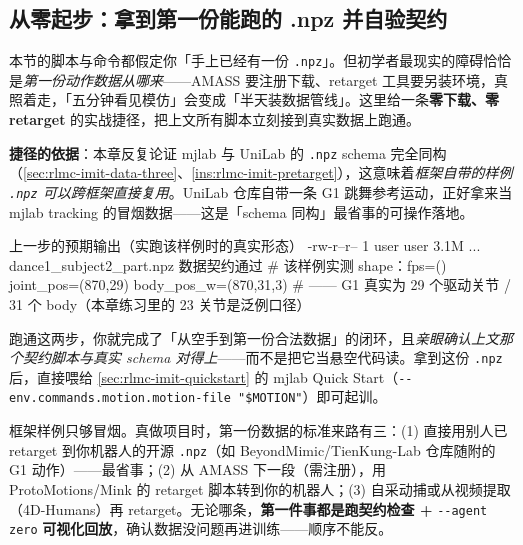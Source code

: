 \subsection{从零起步：拿到第一份能跑的 .npz 并自验契约}
\label{sec:rlmc-imit-data-bootstrap}

本节的脚本与命令都假定你「手上已经有一份 \texttt{.npz}」。但初学者最现实的障碍恰恰是\emph{第一份动作数据从哪来}——AMASS 要注册下载、retarget 工具要另装环境，真照着走，「五分钟看见模仿」会变成「半天装数据管线」。这里给一条\textbf{零下载、零 retarget} 的实战捷径，把上文所有脚本立刻接到真实数据上跑通。

\textbf{捷径的依据}：本章反复论证 mjlab 与 UniLab 的 \texttt{.npz} schema 完全同构（\cref{sec:rlmc-imit-data-three}、\cref{ins:rlmc-imit-pretarget}），这意味着\emph{框架自带的样例 \texttt{.npz} 可以跨框架直接复用}。UniLab 仓库自带一条 G1 跳舞参考运动，正好拿来当 mjlab tracking 的冒烟数据——这是「schema 同构」最省事的可操作落地。


\begin{codebox}[text]{上一步的预期输出（实跑该样例时的真实形态）}
-rw-r--r-- 1 user user 3.1M ... dance1_subject2_part.npz
数据契约通过
# 该样例实测 shape：fps=()  joint_pos=(870,29)  body_pos_w=(870,31,3)
#   —— G1 真实为 29 个驱动关节 / 31 个 body（本章练习里的 23 关节是泛例口径）
\end{codebox}

跑通这两步，你就完成了「从空手到第一份合法数据」的闭环，且\emph{亲眼确认上文那个契约脚本与真实 schema 对得上}——而不是把它当悬空代码读。拿到这份 \texttt{.npz} 后，直接喂给 \cref{sec:rlmc-imit-quickstart} 的 mjlab Quick Start（\verb|--env.commands.motion.motion-file "$MOTION"|）即可起训。

\begin{note}[正经项目里第一份数据怎么来]
框架样例只够冒烟。真做项目时，第一份数据的标准来路有三：(1) 直接用别人已 retarget 到你机器人的开源 \texttt{.npz}（如 BeyondMimic/TienKung-Lab 仓库随附的 G1 动作）——最省事；(2) 从 AMASS 下一段（需注册），用 ProtoMotions/Mink 的 retarget 脚本转到你的机器人；(3) 自采动捕或从视频提取（4D-Humans）再 retarget。无论哪条，\textbf{第一件事都是跑契约检查 +} \verb|--agent zero| \textbf{可视化回放}，确认数据没问题再进训练——顺序不能反。
\end{note}

